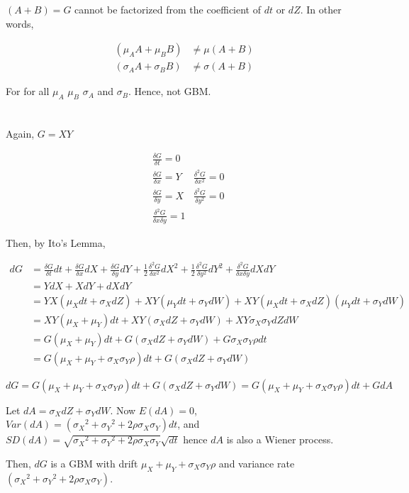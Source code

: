 \documentclass[11pt]{scrartcl}
\renewcommand{\dfrac}[2]{\ensuremath{\frac{\delta #1}{\delta #2}}}
\newcommand{\ddfrac}[2]{\ensuremath{\frac{\delta^2 #1}{\delta #2^2}}}
\newcommand{\dddfrac}[3]{\ensuremath{\frac{\delta^2 #1}{\delta #2 \delta #3}}}
\newcommand{\mux}{\ensuremath{\mu_X}}
\newcommand{\muy}{\ensuremath{\mu_Y}}
\newcommand{\six}{\ensuremath{\sigma_X}}
\newcommand{\siy}{\ensuremath{\sigma_Y}}
\begin{document}
$(A+B) = G$ cannot be factorized from the coefficient of $dt$ or $dZ$. In other words, 

\begin{align*}
(\mu_A A + \mu_B B) &\neq \mu(A+B) \\
(\sigma_A A + \sigma_B B) &\neq \sigma(A+B)
\end{align*}

For for all $\mu_A$ $\mu_B$ $\sigma_A$ and $\sigma_B$. Hence, not GBM.

\section{}

Again, $G=XY$

\begin{align*}
&\dfrac{G}{t} = 0 &\\
&\dfrac{G}{x} = Y &\ddfrac{G}{x} = 0 \\
&\dfrac{G}{y} = X &\ddfrac{G}{y} = 0 \\
&\dddfrac{G}{x}{y} = 1
\end{align*}

Then, by Ito's Lemma,

\begin{align*}
dG &= \dfrac{G}{t}dt + \dfrac{G}{x}dX + \dfrac{G}{y}dY + \frac{1}{2}\ddfrac{G}{x}dX^2 + \frac{1}{2}\ddfrac{G}{y}dY^2 + \dddfrac{G}{x}{y}dXdY \\
&= YdX + XdY + dXdY \\
&= YX(\mux dt + \six dZ) + XY(\muy dt + \siy dW) + XY(\mux dt + \six dZ)(\muy dt + \siy dW) \\
&= XY(\mux + \muy)dt + XY(\six dZ + \siy dW) +  XY\six \siy dZdW \\
&= G(\mux + \muy)dt + G(\six dZ + \siy dW) + G\six \siy \rho dt \\
&= G(\mux + \muy + \six\siy\rho)dt + G(\six dZ + \siy dW)
\end{align*}

\[dG = G(\mux + \muy + \six\siy\rho)dt + G(\six dZ + \siy dW) = G(\mux + \muy + \six\siy\rho)dt + GdA\]

Let $dA = \six dZ + \siy dW$. Now $E(dA) = 0$, $Var(dA) = (\six^2 + \siy^2 + 2\rho\six\siy) dt$, and $SD(dA) = \sqrt{\six^2 + \siy^2 + 2\rho\six\siy} \sqrt{dt}$ hence $dA$ is also a Wiener process.

Then, $dG$ is a GBM with drift $\mux + \muy + \six\siy\rho$ and variance rate $(\six^2 + \siy^2 + 2\rho\six\siy)$.

\section{}
\end{document}
